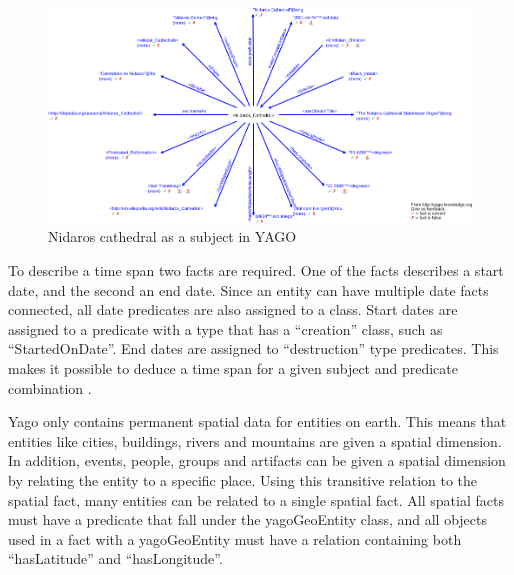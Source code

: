 \begin{figure}
  \centering
  \includegraphics[scale=0.5]{figs/Nidaros_Cathedral.png}
  \caption[Nidaros cathedral as a subject in YAGO]{Nidaros cathedral as a subject in YAGO\protect\footnotemark}
  \label{fig:Nidaros}
\end{figure}

To describe a time span two facts are required. One of the facts describes a start date, and the second an end date. Since an entity can have multiple date facts connected, all date predicates are also assigned to a class. Start dates are assigned to a predicate with a type that has a ``creation'' class, such as ``StartedOnDate''. End dates are assigned to ``destruction'' type predicates. This makes it possible to deduce a time span for a given subject and predicate combination \cite{yago}.

Yago only contains permanent spatial data for entities on earth. This means that entities like cities, buildings, rivers and mountains are given a spatial dimension. In addition, events, people, groups and artifacts can be given a spatial dimension by relating the entity to a specific place. Using this transitive relation to the spatial fact, many entities can be related to a single spatial fact. All spatial facts must have a predicate that fall under the yagoGeoEntity class, and all objects used in a fact with a yagoGeoEntity must have a relation containing both ``hasLatitude'' and ``hasLongitude''.


